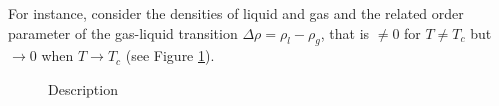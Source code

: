\documentclass[../main/main.tex]{subfiles}
\begin{document}
For instance, consider the densities of liquid and gas and the related order parameter of the gas-liquid transition \( \Delta \rho = \rho _{l} - \rho _{g} \), that is \( \neq 0 \) for \( T \neq T_c \) but \( \rightarrow 0 \) when \( T \rightarrow T_c \) (see Figure \ref{fig:3_2}).


\begin{figure}[h!]
\begin{minipage}[c]{0.5\linewidth}
\centering
{}
\end{minipage}
\begin{minipage}[]{0.5\linewidth}
\centering
{}
\end{minipage}
\caption{\label{fig:3_2} Description}
\end{figure}
\end{document}
